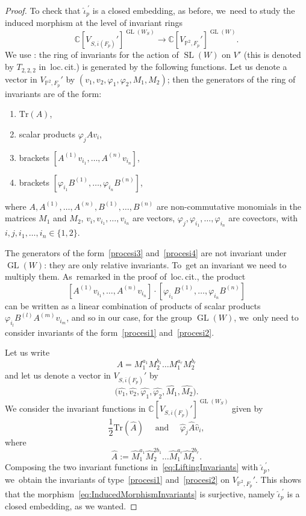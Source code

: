 \documentclass[JEP,XML,SOM,Unicode,published]{cedram}
\newenvironment{enumeratea}
{\bgroup\def\theenumi{\alph{enumi}}\begin{enumerate}}
{\end{enumerate}\egroup}
\newcommand{\CC}{{\mathbb C}}\let\C\CC
\newcommand{\PP}{{\mathbb P}}\let\P\PP
\DeclareMathOperator{\GL}{GL}
\DeclareMathOperator{\SL}{SL}
\let\phi\varphi
\theoremstyle{definition}
\begin{document}
\begin{proof}
To check that $\widehat{\iota}_p^{\ \prime}$ is a closed embedding, as before, we~need to study the induced morphism at the level of invariant rings
\begin{equation}\label{eq:InducedMorphismInvariants}
\CC[V_{S,\overline{\iota}(F_p)}']^{\GL(W_S)}\to \CC[V_{\PP^2,F_p}']^{\GL(W)}.
\end{equation}
We use \cite[Th.\,12.1]{procesi:invariants}: the ring of invariants for the action of $\SL(W)$ on $V'$ (this is denoted by $T_{2,2,2}$ in~loc.\,cit.) is generated by the following functions.
Let us denote a vector in $V_{\PP^2,F_p}'$ by $(v_1,v_2,\phi_1,\phi_2,M_1,M_2)$; then the generators of the ring of invariants are of the form:
\begin{enumeratea}
\item\label{procesi1} $\mathrm{Tr}(A)$,
\item\label{procesi2} scalar products $\phi_jAv_i$,
\item\label{procesi3} brackets $[A^{(1)}v_{i_1},\dots,A^{(n)} v_{i_n}]$,
\item\label{procesi4} brackets $[\phi_{i_1}B^{(1)},\dots,\phi_{i_n} B^{(n)}]$,
\end{enumeratea}
where $A,A^{(1)},\dots,A^{(n)},B^{(1)},\dots,B^{(n)}$ are non-commutative monomials in the matrices $M_1$ and $M_2$, $v_i,v_{i_1},\dots,v_{i_n}$ are vectors, $\phi_j,\phi_{i_1},\dots,\phi_{i_n}$ are covectors, with $i,j,i_1,\dots,i_n\in\{1,2\}$.

The generators of the form~\ref{procesi3} and~\ref{procesi4} are not invariant under $\GL(W)$: they are only relative invariants. To~get an invariant we need to multiply them. As~remarked in the proof of~loc.\,cit., the product
\[
[A^{(1)}v_{i_1},\dots,A^{(n)} v_{i_n}] \cdot [\phi_{i_1}B^{(1)},\dots,\phi_{i_n} B^{(n)}]
\]
can be written as a linear combination of products of scalar products $\phi_{i_l}B^{(l)}A^{(m)}v_{i_m}$, and so in our case, for the group $\GL(W)$, we~only need to consider invariants of the form~\ref{procesi1} and~\ref{procesi2}.

Let us write
\[
A=M_1^{a_1}M_2^{b_1}\dots M_1^{a_r}M_2^{b_r}
\]
and let us denote a vector in $V_{S,\overline{\iota}(F_p)}'$ by
\[
\bigl(\widehat{v_1},\widehat{v_2},\widehat{\phi_1},\widehat{\phi_2},\widehat{M_1},\widehat{M_2}\bigr).
\]
We consider the invariant functions in $\CC[V_{S,\overline{\iota}(F_p)}']^{\GL(W_S)}$ given by
\begin{equation}\label{eq:LiftingInvariants}
\frac 12 \mathrm{Tr} (\widehat{A})\quad \text{ and }\quad \widehat{\phi}_j \widehat{A} \widehat{v}_i,
\end{equation}
where
\[
\widehat{A} := \widehat{M}_1^{a_1}\widehat{M}_2^{2b_1}\dots \widehat{M}_1^{a_r}\widehat{M}_2^{2b_r}.
\]
Composing the two invariant functions in~\eqref{eq:LiftingInvariants} with $\widehat{\iota}_p^{\ \prime}$, we~obtain the invariants of type~\ref{procesi1} and~\ref{procesi2} on $V_{\PP^2,F_p}'$.
This shows that the morphism~\eqref{eq:InducedMorphismInvariants} is surjective, namely $\widehat{\iota}_p^{\ \prime}$ is a closed embedding, as we wanted.
\end{proof}
\end{document}
